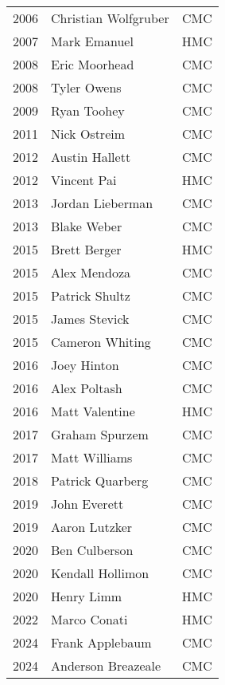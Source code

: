 \begin{table}[htbp]
\begin{tabular}{c l c}
2006 & Christian Wolfgruber & CMC \\
2007 & Mark Emanuel & HMC \\
2008 & Eric Moorhead & CMC \\
2008 & Tyler Owens & CMC \\
2009 & Ryan Toohey & CMC \\
2011 & Nick Ostreim & CMC \\
2012 & Austin Hallett & CMC \\
2012 & Vincent Pai & HMC \\
2013 & Jordan Lieberman & CMC \\
2013 & Blake Weber & CMC \\
2015 & Brett Berger & HMC \\
2015 & Alex Mendoza & CMC \\
2015 & Patrick Shultz & CMC \\
2015 & James Stevick & CMC \\
2015 & Cameron Whiting & CMC \\
2016 & Joey Hinton & CMC \\
2016 & Alex Poltash & CMC \\
2016 & Matt Valentine & HMC \\
2017 & Graham Spurzem & CMC \\
2017 & Matt Williams & CMC \\
2018 & Patrick Quarberg & CMC \\
2019 & John Everett & CMC \\
2019 & Aaron Lutzker & CMC \\
2020 & Ben Culberson & CMC \\
2020 & Kendall Hollimon & CMC \\
2020 & Henry Limm & HMC \\
2022 & Marco Conati & HMC \\
2024 & Frank Applebaum & CMC \\
2024 & Anderson Breazeale & CMC \\
\bottomrule
\end{tabular}
\end{table}

